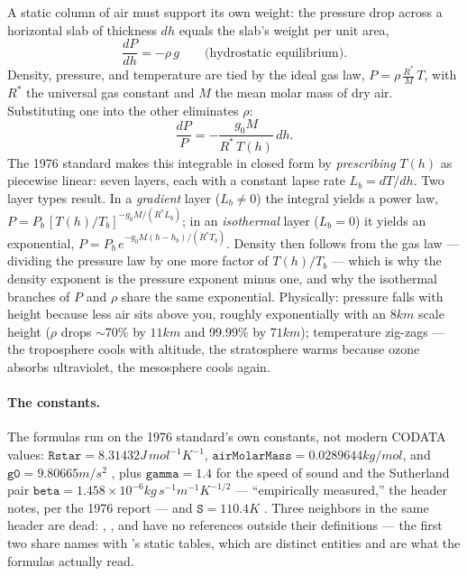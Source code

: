 \begin{physbox}
A static column of air must support its own weight: the pressure drop across a horizontal
slab of thickness $dh$ equals the slab's weight per unit area,
\begin{equation*}
\frac{dP}{dh} = -\rho\, g
\qquad\text{(hydrostatic equilibrium).}
\end{equation*}
Density, pressure, and temperature are tied by the ideal gas law,
$P = \rho\,\tfrac{R^{*}}{M}\,T$, with $R^{*}$ the universal gas constant and $M$ the mean
molar mass of dry air. Substituting one into the other eliminates $\rho$:
\begin{equation*}
\frac{dP}{P} = -\frac{g_0 M}{R^{*}\,T(h)}\, dh.
\end{equation*}
The 1976 standard makes this integrable in closed form by \emph{prescribing} $T(h)$ as
piecewise linear: seven layers, each with a constant lapse rate $L_b = dT/dh$. Two layer
types result. In a \emph{gradient} layer ($L_b \neq 0$) the integral yields a power law,
$P = P_b\,[T(h)/T_b]^{-g_0 M/(R^{*} L_b)}$; in an \emph{isothermal} layer ($L_b = 0$) it
yields an exponential, $P = P_b\, e^{-g_0 M (h - h_b)/(R^{*} T_b)}$. Density then follows
from the gas law --- dividing the pressure law by one more factor of $T(h)/T_b$ --- which is
why the density exponent is the pressure exponent minus one, and why the isothermal branches
of $P$ and $\rho$ share the same exponential. Physically: pressure falls with height because
less air sits above you, roughly exponentially with an $8\unit{km}$ scale height ($\rho$
drops $\sim$70\% by $11\unit{km}$ and 99.99\% by $71\unit{km}$); temperature zig-zags --- the
troposphere cools with altitude, the stratosphere warms because ozone absorbs ultraviolet,
the mesosphere cools again.
\end{physbox}

\paragraph{The constants.} The formulas run on the 1976 standard's own constants, not
modern CODATA values: $\mathtt{Rstar} = 8.31432\unit{J\,mol^{-1}K^{-1}}$,
$\mathtt{airMolarMass} = 0.0289644\unit{kg/mol}$, and $\mathtt{g0} = 9.80665\unit{m/s^2}$
, plus $\mathtt{gamma} = 1.4$ for the speed of sound
 and the Sutherland pair
$\mathtt{beta} = 1.458\times10^{-6}\unit{kg\,s^{-1}m^{-1}K^{-1/2}}$ --- ``empirically
measured,'' the header notes, per the 1976 report --- and $\mathtt{S} = 110.4\unit{K}$
. Three neighbors in the same header are dead:
, , and  have no
references outside their definitions  --- the first two
share names with 's static tables, which are distinct entities
and are what the formulas actually read.

